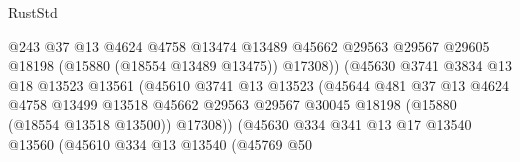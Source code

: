 \begin{lexlean}{RustStd}
\begin{coremodule}
                                          @243
                                          @37
                                          @13
                                          @4624
                                          @4758
                                          @13474
                                          @13489
                                          @45662
                                          @29563
                                          @29567
                                          @29605
                                          @18198
                                          (@15880 (@18554 @13489 @13475))
                                          @17308))
                                      (@45630
                                        @3741
                                        @3834
                                        @13
                                        @18
                                        @13523
                                        @13561
                                        (@45610
                                          @3741
                                          @13
                                          @13523
                                          (@45644
                                            @481
                                            @37
                                            @13
                                            @4624
                                            @4758
                                            @13499
                                            @13518
                                            @45662
                                            @29563
                                            @29567
                                            @30045
                                            @18198
                                            (@15880 (@18554 @13518 @13500))
                                            @17308))
                                        (@45630
                                          @334
                                          @341
                                          @13
                                          @17
                                          @13540
                                          @13560
                                          (@45610
                                            @334
                                            @13
                                            @13540
                                            (@45769
                                              @50

\end{coremodule}
\end{lexlean}
